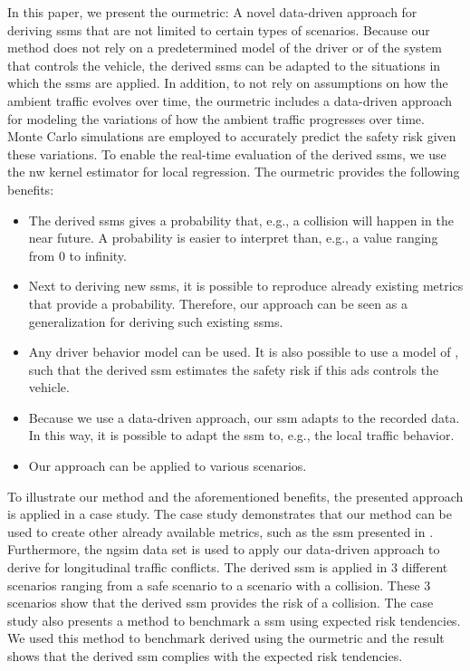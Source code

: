 \cstarta In this paper, we present the \ac{ourmetric}: A novel data-driven approach for deriving \acp{ssm} that are not limited to certain types of scenarios.
Because our method does not rely on a predetermined model of the driver or of the system that controls the vehicle, the derived \acp{ssm} can be adapted to the situations in which the \acp{ssm} are applied. 
In addition, to not rely on assumptions on how the ambient traffic evolves over time, the \ac{ourmetric}  includes a data-driven approach for modeling the variations of how the ambient traffic progresses over time. 
Monte Carlo simulations are employed to accurately predict the safety risk given these variations.
To enable the real-time evaluation of the derived \acp{ssm}, we use the \ac{nw} kernel estimator \autocite{wasserman2006nonparametric} for local regression.
The \ac{ourmetric} provides the following benefits: \cenda
\begin{itemize}
	\item The derived \acp{ssm} gives a probability that, e.g., a collision will happen in the near future. 
	A probability is easier to interpret than, e.g., a value ranging from 0 to infinity.
	
	\item \cstarta Next to deriving new \acp{ssm}, \cenda it is possible to reproduce already existing metrics that provide a probability. 
	Therefore, our approach can be seen as a generalization for deriving such existing \acp{ssm}.
	
	\item Any driver behavior model can be used.
	It is also possible to use a model of , such that the derived \ac{ssm} estimates the safety risk if this \ac{ads} controls the vehicle.
	
	\item Because we use a data-driven approach, our \ac{ssm} adapts to the recorded data. 
	In this way, it is possible to \cstarta adapt the \ac{ssm} to, e.g., the local traffic behavior\cenda.
	
	\item Our approach can be applied to various scenarios.
\end{itemize}

To illustrate our method and the aforementioned benefits, the presented approach is applied in a case study.
The case study demonstrates that our method can be used to create other already available metrics, such as the \ac{ssm} presented in \autocite{wang2014evaluation}.
Furthermore, the \ac{ngsim} data set \autocite{kovvali2007video} is used to apply our data-driven approach to derive  for longitudinal traffic conflicts.
The derived \ac{ssm} is applied in 3 different scenarios ranging from a safe scenario to a scenario with a collision.
These 3 scenarios show that the derived \ac{ssm} provides the risk of a collision.
The case study also presents a method to benchmark a \ac{ssm} using expected risk tendencies.
\cstarta We used this method to benchmark  derived using the \ac{ourmetric} and the result shows that the derived \ac{ssm} complies with the expected risk tendencies. \cenda

